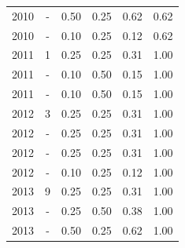 \begin{table}[H]
\begin{tabular}{| l | c | c | c | c | c |}
            2010
          &
          -
          &
          0.50
          &
          0.25
          &
          0.62
          &
            {\color{blue} 0.62}
          \\
            2010
          &
          -
          &
          0.10
          &
          0.25
          &
          0.12
          &
            {\color{blue} 0.62}
          \\
\hline
            2011
          &
          1
          &
          0.25
          &
          0.25
          &
          0.31
          &
            {\color{blue} 1.00}
          \\
            2011
          &
          -
          &
          0.10
          &
          0.50
          &
          0.15
          &
            {\color{blue} 1.00}
          \\
            2011
          &
          -
          &
          0.10
          &
          0.50
          &
          0.15
          &
            {\color{blue} 1.00}
          \\
\hline
            2012
          &
          3
          &
          0.25
          &
          0.25
          &
          0.31
          &
            {\color{blue} 1.00}
          \\
            2012
          &
          -
          &
          0.25
          &
          0.25
          &
          0.31
          &
            {\color{blue} 1.00}
          \\
            2012
          &
          -
          &
          0.25
          &
          0.25
          &
          0.31
          &
            {\color{blue} 1.00}
          \\
            2012
          &
          -
          &
          0.10
          &
          0.25
          &
          0.12
          &
            {\color{blue} 1.00}
          \\
\hline
            2013
          &
          9
          &
          0.25
          &
          0.25
          &
          0.31
          &
            {\color{blue} 1.00}
          \\
            2013
          &
          -
          &
          0.25
          &
          0.50
          &
          0.38
          &
            {\color{blue} 1.00}
          \\
            2013
          &
          -
          &
          0.50
          &
          0.25
          &
          0.62
          &
            {\color{blue} 1.00}
          \\

\end{tabular}
\end{table}
